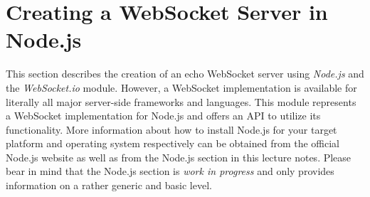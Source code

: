 \documentclass[a4paper, justified, notoc]{tufte-handout} %
\begin{document}
%
%
%
%


\section{Creating a WebSocket Server in Node.js} %
\label{sec:creating_a_websocket_server}

This section describes the creation of an echo WebSocket server using \emph{Node.js} and the \emph{WebSocket.io} module. However, a WebSocket implementation is available for literally all major server-side frameworks and languages. This module represents a WebSocket implementation for Node.js and offers an API to utilize its functionality. More information about how to install Node.js for your target platform and operating system respectively can be obtained from the official Node.js website as well as from the Node.js section in this lecture notes. Please bear in mind that the Node.js section is \emph{work in progress} and only provides information on a rather generic and basic level.
\end{document}
